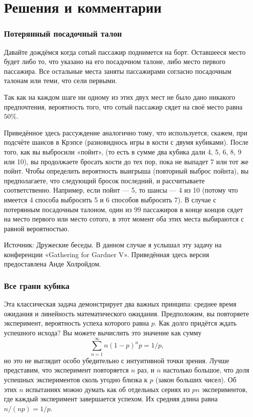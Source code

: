 \section*{Решения и комментарии}

\subsubsection*{Потерянный посадочный талон}%

Давайте дождёмся когда сотый пассажир поднимется на борт. 
Оставшееся место будет либо то, что указано на его посадочном талоне, либо место первого пассажира.
Все остальные места заняты пассажирами согласно посадочным талонам или теми, что сели первыми.

Так как на каждом шаге ни одному из этих двух мест не было дано никакого предпочтения, вероятность того, что сотый пассажир сядет на своё место равна $50\%$.
\heart

Приведённое здесь рассуждение аналогично тому, что используется, скажем, при подсчёте шансов в Крэпсе (разновиднось игры в кости с двумя кубиками).
После того, как вы выбросили «пойнт»,
(то есть в сумме два кубика дали 4, 5, 6, 8, 9 или 10), вы продолжаете бросать кости до тех пор, пока не выпадет 7 или тот же пойнт.
Чтобы определить вероятность выигрыша (повторный выброс пойнта), вы предполагаете, что следующий бросок последний, и рассчитываете соответственно.
Например, если пойнт --- 5, то шансы --- 4 из 10 (потому что имеется 4 способа выбросить 5 и 6 способов выбросить 7).
В случае с потерянным посадочным талоном, один из 99 пассажиров в конце концов сядет на место первого или место сотого, в этот момент оба этих места выбираются с равной вероятностью. 

\medskip

Источник: Дружеские беседы.
В данном случае я услышал эту задачу на конференции «Gathering for Gardner V».
Приведённая здесь версия предоставлена Анде Холройдом. %

\subsubsection*{Все грани кубика}%

Эта классическая задача демонстрирует два важных принципа: среднее время ожидания и линейность математического ожидания. %
Предположим, вы повторяете эксперимент, вероятность успеха которого равна $p$.
Как долго придётся ждать успешного исхода? Вы можете вычислить это значение как сумму
\[\sum_{n=1}^\infty n(1-p)^np=1/p,\]
но это не выглядит особо убедительно с интуитивной точки зрения.
Лучше представим, что эксперимент повторяется $n$ раз, и $n$ настолько большое, что доля успешных экспериментов сколь угодно близка к $p$ (закон больших чисел).
Об этих $n$ испытаниях можно думать как об отдельных сериях из $pn$ экспериментов, где каждый эксперимент завершается успехом.
Их средняя длина равна $n/(np)=1/p$.

